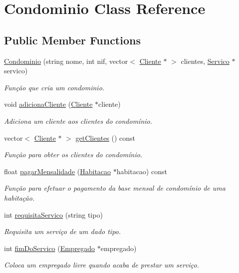 \hypertarget{class_condominio}{}\section{Condominio Class Reference}
\label{class_condominio}
\subsection*{Public Member Functions}
\begin{DoxyCompactItemize}
\item 
\hyperlink{class_condominio_a73d20c28b4b08007af711d30626b38bb}{Condominio} (string nome, int nif, vector$<$ \hyperlink{class_cliente}{Cliente} $\ast$ $>$ clientes, \hyperlink{class_servico}{Servico} $\ast$servico)
\begin{DoxyCompactList}\small\item\em Função que cria um condominio. \end{DoxyCompactList}\item 
void \hyperlink{class_condominio_a423f977875d9b8b5fdc5af2d9cd9dbf2}{adiciona\+Cliente} (\hyperlink{class_cliente}{Cliente} $\ast$cliente)
\begin{DoxyCompactList}\small\item\em Adiciona um cliente aos clientes do condomínio. \end{DoxyCompactList}\item 
vector$<$ \hyperlink{class_cliente}{Cliente} $\ast$ $>$ \hyperlink{class_condominio_a6a9100e8a8a48847785f4c4b108ab8db}{get\+Clientes} () const 
\begin{DoxyCompactList}\small\item\em Função para obter os clientes do condomínio. \end{DoxyCompactList}\item 
float \hyperlink{class_condominio_a16747ea7d4e1b442b1985725f5a9aeab}{pagar\+Mensalidade} (\hyperlink{class_habitacao}{Habitacao} $\ast$habitacao) const 
\begin{DoxyCompactList}\small\item\em Função para efetuar o pagamento da base mensal de condomínio de uma habitação. \end{DoxyCompactList}\item 
int \hyperlink{class_condominio_ac80b64964b0336941a0fb70213745d3c}{requisita\+Servico} (string tipo)
\begin{DoxyCompactList}\small\item\em Requisita um serviço de um dado tipo. \end{DoxyCompactList}\item 
int \hyperlink{class_condominio_af2c2cdd83d43ea6641542efe01ff94b9}{fim\+Do\+Servico} (\hyperlink{class_empregado}{Empregado} $\ast$empregado)
\begin{DoxyCompactList}\small\item\em Coloca um empregado livre quando acaba de prestar um serviço. \end{DoxyCompactList}\end{DoxyCompactItemize}


